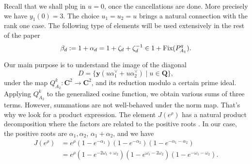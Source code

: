\documentclass{amsart}
\newcommand{\mb}{\mathbf}
\newcommand{\C}{\mathbf C}
\newcommand{\Q}{\mathbf Q}
\newcommand{\Fix}{\textnormal{Fix}}
\numberwithin{equation}{section}
\theoremstyle{plain}
\theoremstyle{definition}
\begin{document}
Recall that we shall plug in $u=0$, once the cancellations are done. More precisely we have $y_1(0)=3$. The choice $u_1=u_2=u$ brings a natural connection with the rank one case. The following type of elements will be used extensively in the rest of the paper
\begin{equation*}
\beta_d:=1+\alpha_d=1+\zeta_d + \zeta_d^{-1}\in 1+\Fix(P_{A_1}^q).
\end{equation*}

Our main purpose is to understand the image of the diagonal
\[D=\{ \mb{y}(u\alpha_1^\vee +u\alpha_2^\vee) \mathrel{|} u\in\Q \},\]
under the map $Q_{A_2}^k:\C^2 \rightarrow \C^2$, and its reduction modulo a certain prime ideal. Applying $Q_{A_2}^k$ to the generalized cosine function, we obtain various sums of three terms. However, summations are not well-behaved under the norm map. That's why we look for a product expression. The element $J(e^\rho)$ has a natural product decomposition where the factors are related to the positive roots \cite[VI $\S$3 Proposition 2.(i)]{bourbaki2002}. In our case, the positive roots are $\alpha_1,\alpha_2$, $\alpha_1+\alpha_2$, and we have
\begin{align*}
	J(e^{\rho})&=e^{\rho}\left(1-e^{-\alpha_1}\right)\left(1-e^{-\alpha_2}\right)\left(1-e^{-\alpha_1-\alpha_2}\right)\\
	&=e^{\rho}\left(1-e^{-2\omega_1+\omega_2}\right)\left(1-e^{\omega_1-2\omega_2}\right)\left(1-e^{-\omega_1-\omega_2}\right).
\end{align*}
\end{document}
